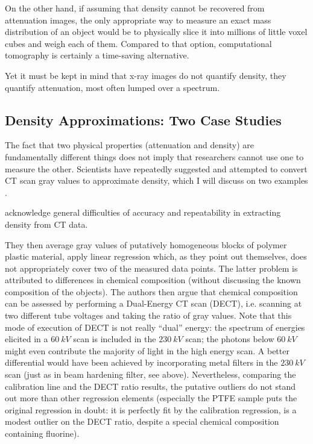 On the other hand, if assuming that density cannot be recovered from attenuation images, the only appropriate way to measure an exact mass distribution of an object would be to physically slice it into millions of little voxel cubes and weigh each of them.
Compared to that option, computational tomography is certainly a time-saving alternative.


Yet it must be kept in mind that x-ray images do not quantify density, they quantify attenuation, most often lumped over a spectrum.


\subsection{Density Approximations: Two Case Studies}
\label{sec:orgc613fe0}
The fact that two physical properties (attenuation and density) are fundamentally different things does not imply that researchers cannot use one to measure the other.
Scientists have repeatedly suggested and attempted to convert CT scan gray values to approximate density, which I will discuss on two examples \citep{DuPlessis2013,Durston2022}.


\citet{DuPlessis2013} acknowledge general difficulties of accuracy and repeatability in extracting density from CT data.

They then average gray values of putatively homogeneous blocks of polymer plastic material, apply linear regression which, as they point out themselves, does not appropriately cover two of the measured data points.
The latter problem is attributed to differences in chemical composition (without discussing the known composition of the objects).
The authors then argue that chemical composition can be assessed by performing a Dual-Energy CT scan (DECT), i.e. scanning at two different tube voltages and taking the ratio of gray values.
Note that this mode of execution of DECT is not really ``dual'' energy: the spectrum of energies elicited in a \(60\ kV\) scan is included in the \(230\ kV\) scan; the photons below \(60\ kV\) might even contribute the majority of light in the high energy scan.
A better differential would have been achieved by incorporating metal filters in the \(230\ kV\) scan (just as in beam hardening filter, see above).
Nevertheless, comparing the calibration line and the DECT ratio results, the putative outliers do not stand out more than other regression elements (especially the PTFE sample puts the original regression in doubt: it is perfectly fit by the calibration regression, is a modest outlier on the DECT ratio, despite a special chemical composition containing fluorine).

